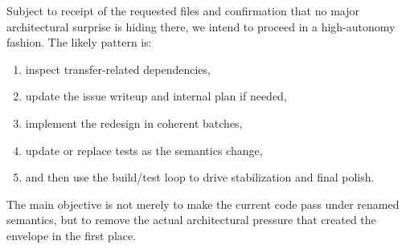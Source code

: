 \documentclass[11pt]{article}
\begin{document}
Subject to receipt of the requested files and confirmation that no major architectural surprise is hiding there, we intend to proceed in a high-autonomy fashion.  The likely pattern is:

\begin{enumerate}[leftmargin=2em]
\item inspect transfer-related dependencies,
\item update the issue writeup and internal plan if needed,
\item implement the redesign in coherent batches,
\item update or replace tests as the semantics change,
\item and then use the build/test loop to drive stabilization and final polish.
\end{enumerate}

The main objective is not merely to make the current code pass under renamed semantics, but to remove the actual architectural pressure that created the envelope in the first place.
\end{document}
